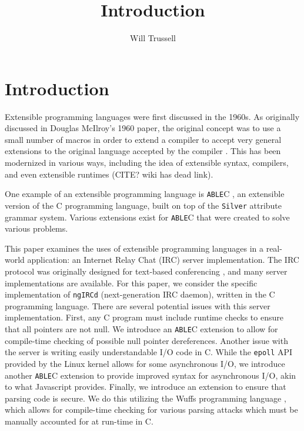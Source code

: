 \documentclass[main.tex]{subfiles}
\author{Will Trussell}
\title{Introduction}
\begin{document}
\section{Introduction}

Extensible programming languages were first discussed in the 1960s. As
originally discussed in Douglas McIlroy's 1960 paper, the original concept was
to use a small number of macros in order to extend a compiler to accept very
general extensions to the original language accepted by the compiler 
\cite{McIlroy}. This has been modernized in various ways, including the idea
of extensible syntax, compilers, and even extensible runtimes (CITE? wiki has
dead link).

One example of an extensible programming language is \verb|ABLE|C \cite{ableC}, 
an extensible version of the C programming language, built on top of the 
\verb|Silver| \cite{silver} attribute grammar system. Various extensions exist for 
\verb|ABLE|C that were created to solve various problems. 

This paper examines the uses of extensible programming languages in a real-world
application: an Internet Relay Chat (IRC) server implementation. The IRC
protocol was originally designed for text-based conferencing \cite{IRC}, and
many server implementations are available. For this paper, we consider the
specific implementation of \verb|ngIRCd| (next-generation IRC daemon), written 
in the C programming language. There are several potential issues with this 
server implementation. First, any C program must include runtime checks to 
ensure that all pointers are not null. We introduce an \verb|ABLE|C extension to 
allow for compile-time checking of possible null pointer dereferences.  Another 
issue with the server is writing easily understandable I/O code in C. While the 
\verb|epoll| API provided by the Linux kernel allows for some asynchronous I/O, 
we introduce another \verb|ABLE|C extension to provide improved syntax for 
asynchronous I/O, akin to what Javascript provides. Finally, we introduce an 
extension to ensure that parsing code is secure. We do this utilizing the Wuffs 
programming language \cite{wuffs}, which allows for compile-time checking for various 
parsing attacks which must be manually accounted for at run-time in C.
\end{document}
